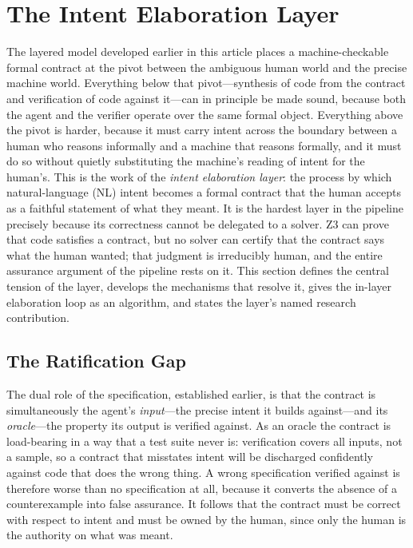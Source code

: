 \section{The Intent Elaboration Layer}
\label{sec:intent_layer}

The layered model developed earlier in this article places a machine-checkable formal contract at the pivot between the ambiguous human world and the precise machine world. Everything below that pivot---synthesis of code from the contract and verification of code against it---can in principle be made sound, because both the agent and the verifier operate over the same formal object. Everything above the pivot is harder, because it must carry intent across the boundary between a human who reasons informally and a machine that reasons formally, and it must do so without quietly substituting the machine's reading of intent for the human's. This is the work of the \emph{intent elaboration layer}: the process by which natural-language (NL) intent becomes a formal contract that the human accepts as a faithful statement of what they meant. It is the hardest layer in the pipeline precisely because its correctness cannot be delegated to a solver. Z3 can prove that code satisfies a contract, but no solver can certify that the contract says what the human wanted; that judgment is irreducibly human, and the entire assurance argument of the pipeline rests on it. This section defines the central tension of the layer, develops the mechanisms that resolve it, gives the in-layer elaboration loop as an algorithm, and states the layer's named research contribution.

\subsection{The Ratification Gap}
\label{subsec:ratification_gap}

The dual role of the specification, established earlier, is that the contract is simultaneously the agent's \emph{input}---the precise intent it builds against---and its \emph{oracle}---the property its output is verified against. As an oracle the contract is load-bearing in a way that a test suite never is: verification covers all inputs, not a sample, so a contract that misstates intent will be discharged confidently against code that does the wrong thing. A wrong specification verified against is therefore worse than no specification at all, because it converts the absence of a counterexample into false assurance. It follows that the contract must be correct with respect to intent and must be owned by the human, since only the human is the authority on what was meant.

